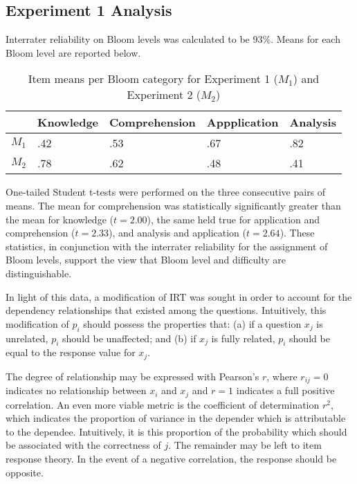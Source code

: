 \subsection{Experiment 1 Analysis}

Interrater reliability on Bloom levels was calculated to be 93\%.  Means for
each Bloom level are reported below.

\begin{table}
\caption{Item means per Bloom category for Experiment 1 ($M_1$) and Experiment 2 ($M_2$)}
\vspace{12pt}
\begin{tabularx}{\textwidth}{|X|X|X|X|X|}
                                                                 \hline
      & \y Knowledge & \y Comprehension & \y Appplication & \y Analysis \\ \hline
\y $M_1$  &  .42 & .53 & .67 & .82  \\ \hline
\y $M_2$  &  .78 & .62 & .48 & .41  \\ \hline
\end{tabularx}
\vspace{24pt}
\end{table}

One-tailed Student t-tests were performed on the three consecutive pairs of
means.  The mean for comprehension was statistically significantly greater than
the mean for knowledge ($t=2.00$), the same held true for application and
comprehension ($t=2.33$), and analysis and application ($t=2.64$).  These
statistics, in conjunction with the interrater reliability for the assignment
of Bloom levels, support the view that Bloom level and difficulty are
distinguishable.

In light of this data, a modification of IRT was sought in order to account for
the dependency relationships that existed among the questions.  Intuitively,
this modification of $p_i$ should possess the properties that: (a) if a
question $x_j$ is unrelated, $p_i$ should be unaffected; and (b) if $x_j$ is
fully related, $p_i$ should be equal to the response value for $x_j$. 

The degree of relationship may be expressed with Pearson's $r$, where
$r_{ij}=0$ indicates no relationship between $x_i$ and $x_j$ and $r=1$
indicates a full positive correlation.  An even more viable metric is the
coefficient of determination $r^2$, which indicates the proportion of variance
in the depender which is attributable to the dependee.  Intuitively, it is this
proportion of the probability which should be associated with the correctness
of $j$.  The remainder may be left to item response theory.  In the event of a
negative correlation, the response should be opposite.


